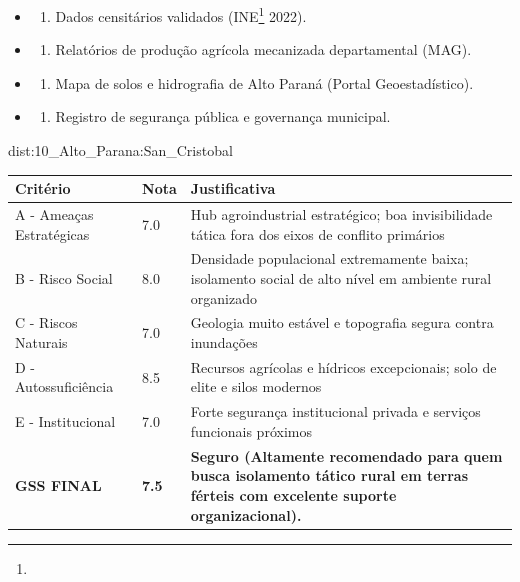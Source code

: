 {\begin{itemize}
\tightlist
\item
  \begin{enumerate}
  \def\labelenumi{\arabic{enumi})}
  \tightlist
  \item
    Dados censitários validados (INE\footnote{\fineINE} 2022).
  \end{enumerate}
\item
  \begin{enumerate}
  \def\labelenumi{\arabic{enumi})}
  \setcounter{enumi}{1}
  \tightlist
  \item
    Relatórios de produção agrícola mecanizada departamental (MAG).
  \end{enumerate}
\item
  \begin{enumerate}
  \def\labelenumi{\arabic{enumi})}
  \setcounter{enumi}{2}
  \tightlist
  \item
    Mapa de solos e hidrografia de Alto Paraná (Portal Geoestadístico).
  \end{enumerate}
\item
  \begin{enumerate}
  \def\labelenumi{\arabic{enumi})}
  \setcounter{enumi}{3}
  \tightlist
  \item
    Registro de segurança pública e governança municipal.
  \end{enumerate}
\end{itemize}}{dist:10_Alto_Parana:San_Cristobal}
\begin{table}[ht!]
\small \begin{tabular}{p{3.0cm}p{0.8cm}p{6.0cm}} \toprule
\textbf{Critério} & \textbf{Nota} & \textbf{Justificativa} \\ \midrule
A - Ameaças Estratégicas & 7.0 & Hub agroindustrial estratégico; boa invisibilidade tática fora dos eixos de conflito primários \\
B - Risco Social & 8.0 & Densidade populacional extremamente baixa; isolamento social de alto nível em ambiente rural organizado \\
C - Riscos Naturais & 7.0 & Geologia muito estável e topografia segura contra inundações \\
D - Autossuficiência & 8.5 & Recursos agrícolas e hídricos excepcionais; solo de elite e silos modernos \\
E - Institucional & 7.0 & Forte segurança institucional privada e serviços funcionais próximos \\
\midrule \textbf{GSS FINAL} & \textbf{7.5} & \textbf{Seguro (Altamente recomendado para quem busca isolamento tático rural em terras férteis com excelente suporte organizacional).} \\ \bottomrule \end{tabular}
\end{table}

